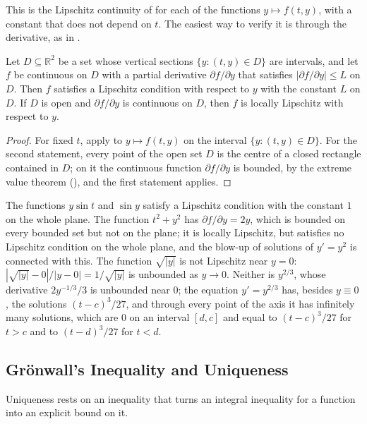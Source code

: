 This is the Lipschitz continuity of  for each of the functions $y\mapsto f(t,y)$, with a constant that does not depend on $t$. The easiest way to verify it is through the derivative, as in .

\begin{proposition}
\label{prop:lipschitz-test}
Let $D\subseteq\mathbb R^2$ be a set whose vertical sections $\{y:(t,y)\in D\}$ are intervals, and let $f$ be continuous on $D$ with a partial derivative $\partial f/\partial y$ that satisfies $|\partial f/\partial y|\le L$ on $D$. Then $f$ satisfies a Lipschitz condition with respect to $y$ with the constant $L$ on $D$. If $D$ is open and $\partial f/\partial y$ is continuous on $D$, then $f$ is locally Lipschitz with respect to $y$.
\end{proposition}

\begin{proof}
For fixed $t$, apply  to $y\mapsto f(t,y)$ on the interval $\{y:(t,y)\in D\}$. For the second statement, every point of the open set $D$ is the centre of a closed rectangle contained in $D$; on it the continuous function $\partial f/\partial y$ is bounded, by the extreme value theorem (), and the first statement applies.
\end{proof}

The functions $y\sin t$ and $\sin y$ satisfy a Lipschitz condition with the constant $1$ on the whole plane. The function $t^2+y^2$ has $\partial f/\partial y=2y$, which is bounded on every bounded set but not on the plane; it is locally Lipschitz, but satisfies no Lipschitz condition on the whole plane, and the blow-up of solutions of $y'=y^2$ is connected with this. The function $\sqrt{|y|}$ is not Lipschitz near $y=0$: $|\sqrt{|y|}-0|/|y-0|=1/\sqrt{|y|}$ is unbounded as $y\to0$. Neither is $y^{2/3}$, whose derivative $2y^{-1/3}/3$ is unbounded near $0$; the equation $y'=y^{2/3}$ has, besides $y\equiv0$, the solutions $(t-c)^3/27$, and through every point of the axis it has infinitely many solutions, which are $0$ on an interval $[d,c]$ and equal to $(t-c)^3/27$ for $t>c$ and to $(t-d)^3/27$ for $t<d$.

\subsection{Gr\"onwall's Inequality and Uniqueness}

Uniqueness rests on an inequality that turns an integral inequality for a function into an explicit bound on it.

